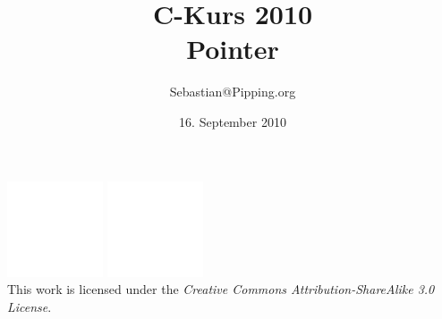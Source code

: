 \documentclass{beamer}
\title{C-Kurs 2010\\Pointer}
\author{Sebastian@Pipping.org}
\date{16. September 2010}
\newcommand{\CcLongnameBySa}{Attribution-ShareAlike}
\newcommand{\CcImageBy}[1]{%
	\includegraphics[scale=#1]{creative-commons/cc-by-white.pdf}%
}
\newcommand{\CcImageSa}[1]{%
	\includegraphics[scale=#1]{creative-commons/cc-sa-white.pdf}%
}
\newcommand{\CcNote}[1]{%
	This work is licensed under the \textit{Creative Commons #1 3.0 License}.%
}
\newcommand{\CcGroupBySa}[2]{%
	\CcImageBy{#1}\hspace*{#2}\CcImageSa{#1}%
}
\begin{document}

\begin{frame}
	\titlepage
	\vfill
	\begin{center}
		\CcGroupBySa{0.33}{0.95ex}\\[2.5ex]
		{\tiny\CcNote{\CcLongnameBySa}}
		\vspace*{-2.5ex}
	\end{center}
\end{frame}


\end{document}
